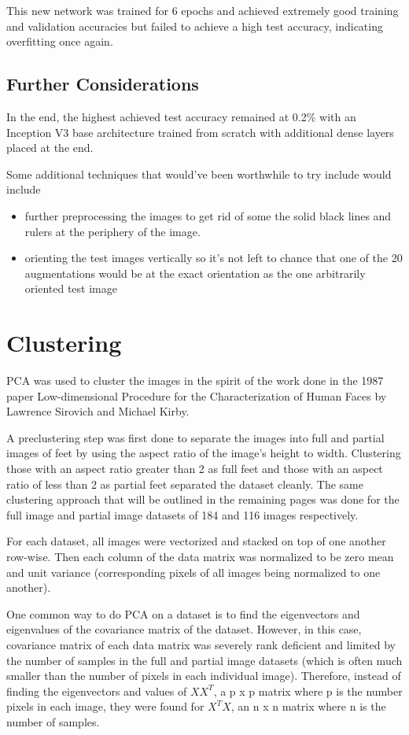 \documentclass{article}
\begin{document}
This new network was trained for 6 epochs and achieved extremely good training and validation accuracies but failed to achieve a high test accuracy, indicating overfitting once again.

\subsection{Further Considerations}

In the end, the highest achieved test accuracy remained at 0.2\% with an Inception V3 base architecture trained from scratch with additional dense layers placed at the end.

Some additional techniques that would've been worthwhile to try include would include

\begin{itemize}
\item further preprocessing the images to get rid of some the solid black lines and rulers at the periphery of the image.
\item orienting the test images vertically so it's not left to chance that one of the 20 augmentations would be at the exact orientation as the one arbitrarily oriented test image
\end{itemize}

\section{Clustering}

PCA was used to cluster the images in the spirit of the work done in the 1987 paper Low-dimensional Procedure for the Characterization of Human Faces by Lawrence Sirovich and Michael Kirby. 

A preclustering step was first done to separate the images into full and partial images of feet by using the aspect ratio of the image's height to width. Clustering those with an aspect ratio greater than 2 as full feet and those with an aspect ratio of less than 2 as partial feet separated the dataset cleanly. The same clustering approach that will be outlined in the remaining pages was done for the full image and partial image datasets of 184 and 116 images respectively.

For each dataset, all images were vectorized and stacked on top of one another row-wise. Then each column of the data matrix was normalized to be zero mean and unit variance (corresponding pixels of all images being normalized to one another).

One common way to do PCA on a dataset is to find the eigenvectors and eigenvalues of the covariance matrix of the dataset. However, in this case, covariance matrix of each data matrix was severely rank deficient and limited by the number of samples in the full and partial image datasets (which is often much smaller than the number of pixels in each individual image). Therefore, instead of finding the eigenvectors and values of $XX^T$, a p x p matrix where p is the number pixels in each image, they were found for $X^TX$, an n x n matrix where n is the number of samples.
\end{document}
